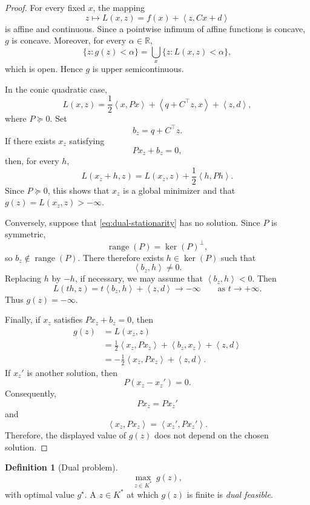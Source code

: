 \documentclass[a4paper,11pt]{book}
\theoremstyle{plain}
\theoremstyle{definition}
\newtheorem{definition}[theorem]{Definition}
\theoremstyle{remark}
\numberwithin{equation}{chapter}
\numberwithin{algorithm}{chapter}
\newcommand{\R}{\mathbb{R}}
\newcommand{\inner}[2]{\left\langle #1, #2 \right\rangle}
\begin{document}
	\begin{proof}
		For every fixed \(x\), the mapping
		\[
		z\longmapsto L(x,z)
		=
		f(x)+\inner{z}{Cx+d}
		\]
		is affine and continuous. Since a pointwise infimum of affine functions is
		concave, \(g\) is concave. Moreover, for every \(\alpha\in\R\),
		\[
		\{z:g(z)<\alpha\}
		=
		\bigcup_x\{z:L(x,z)<\alpha\},
		\]
		which is open. Hence \(g\) is upper semicontinuous.
		
		In the conic quadratic case,
		\[
		L(x,z)
		=
		\frac12\inner{x}{Px}
		+
		\inner{q+C^\top z}{x}
		+
		\inner{z}{d},
		\]
		where \(P\succeq0\). Set
		\[
		b_z=q+C^\top z.
		\]
		If there exists \(x_z\) satisfying
		\[
		Px_z+b_z=0,
		\]
		then, for every \(h\),
		\[
		L(x_z+h,z)
		=
		L(x_z,z)
		+
		\frac12\inner{h}{Ph}.
		\]
		Since \(P\succeq0\), this shows that \(x_z\) is a global minimizer and that
		\(g(z)=L(x_z,z)>-\infty\).
		
		Conversely, suppose that \eqref{eq:dual-stationarity} has no solution. Since
		\(P\) is symmetric,
		\[
		\operatorname{range}(P)=\ker(P)^\perp,
		\]
		so \(b_z\notin\operatorname{range}(P)\). There therefore exists
		\(h\in\ker(P)\) such that
		\[
		\inner{b_z}{h}\neq0.
		\]
		Replacing \(h\) by \(-h\), if necessary, we may assume that
		\(\inner{b_z}{h}<0\). Then
		\[
		L(th,z)
		=
		t\inner{b_z}{h}
		+
		\inner{z}{d}
		\longrightarrow-\infty
		\qquad\text{as }t\to+\infty.
		\]
		Thus \(g(z)=-\infty\).
		
		Finally, if \(x_z\) satisfies \(Px_z+b_z=0\), then
		\begin{align}
			g(z)
			&=L(x_z,z)\\
			&=\frac12\inner{x_z}{Px_z}
			+\inner{b_z}{x_z}
			+\inner{z}{d}\\
			&=-\frac12\inner{x_z}{Px_z}
			+\inner{z}{d}.
		\end{align}
		If \(x_z'\) is another solution, then
		\[
		P(x_z-x_z')=0.
		\]
		Consequently,
		\[
		Px_z=Px_z'
		\]
		and
		\[
		\inner{x_z}{Px_z}
		=
		\inner{x_z'}{Px_z'}.
		\]
		Therefore, the displayed value of \(g(z)\) does not depend on the chosen
		solution.
	\end{proof}
	
	\begin{definition}[Dual problem]
		\begin{equation}
			\max_{z\in K^*}\ g(z) ,
		\end{equation}
		with optimal value $g^\star$. A $z\in K^*$ at which $g(z)$ is finite is
		\emph{dual feasible}.
	\end{definition}
	
\end{document}
